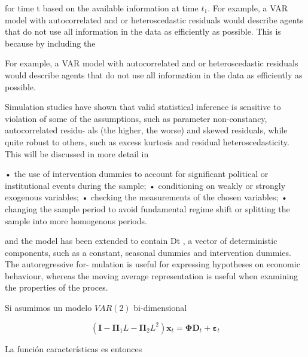 \documentclass[12pt, twoside]{book}\usepackage[]{graphicx}\usepackage[]{color}
\let\bold\boldsymbol
\numberwithin{equation}{section}
\numberwithin{theorem}{section}
\numberwithin{teorema}{section}
\numberwithin{defi}{section}
\numberwithin{prop}{section}
\numberwithin{defi}{section}
\theoremstyle{plain}
\begin{document}
{{for time t based on the available information at time $t_1$. For example, a VAR model
with autocorrelated and or heteroscedastic residuals would describe agents that do not
use all information in the data as efficiently as possible. This is because by including the

 For example, a VAR model
with autocorrelated and or heteroscedastic residuals would describe agents that do not
use all information in the data as efficiently as possible. 

Simulation studies have shown that valid statistical inference is sensitive to violation
of some of the assumptions, such as parameter non-constancy, autocorrelated residu-
als (the higher, the worse) and skewed residuals, while quite robust to others, such as
excess kurtosis and residual heteroscedasticity. This will be discussed in more detail in


• the use of intervention dummies to account for significant political or institutional
events during the sample;
• conditioning on weakly or strongly exogenous variables;
• checking the measurements of the chosen variables;
• changing the sample period to avoid fundamental regime shift or splitting the sample
into more homogenous periods.

and the model has been extended to contain Dt , a vector of deterministic components,
such as a constant, seasonal dummies and intervention dummies. The autoregressive for-
mulation is useful for expressing hypotheses on economic behaviour, whereas the moving average representation is useful when examining the properties of the proces.

Si asumimos un modelo $VAR(2)$ bi-dimensional

\begin{equation}
(\bold{I}-\boldsymbol{\Pi}_{1}L-\boldsymbol{\Pi}_{2}L^{2})\bold{x}_{t} = \boldsymbol{\Phi}\bold{D}_{t}+\bold{\varepsilon}_{t}
\end{equation}

La función características es entonces 

}}
\end{document}
